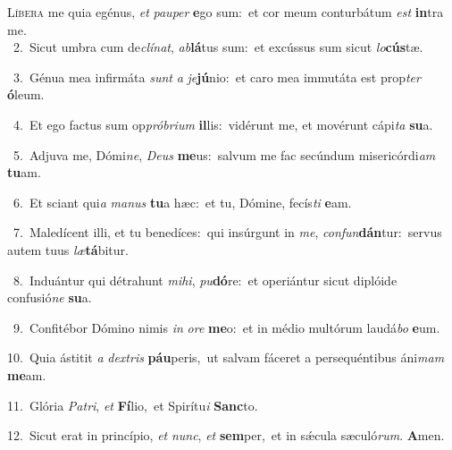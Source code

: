 \lettrine{\initial\textcolor{\initialcolor}{L}}{íbera} me quia egénus, \textit{et} \textit{pau}\-\textit{per} \textbf{e}\-go sum:~\star et cor meum conturbátum \textit{est} \textbf{in}\-tra me.\\
{\numbfont\textcolor{\numbcolor}{~2.}}~Sicut umbra cum de\-\textit{clí}\-\textit{nat}, \textit{ab}\-\textbf{lá}tus sum:~\star et excússus sum sicut \textit{lo}\-\textbf{cús}tæ.\par
{\numbfont\textcolor{\numbcolor}{~3.}}~Génua mea infirmáta \textit{sunt} \textit{a} \textit{je}\-\textbf{jú}nio:~\star et caro mea immutáta est prop\textit{ter} \textbf{ó}\-leum.\par
{\numbfont\textcolor{\numbcolor}{~4.}}~Et ego factus sum op\-\textit{pró}\-\textit{bri}\textit{um} \textbf{il}\-lis:~\star vidérunt me, et movérunt cápi\textit{ta} \textbf{su}\-a.\par
{\numbfont\textcolor{\numbcolor}{~5.}}~Adjuva me, Dómi\-\textit{ne}\-, \textit{De}\-\textit{us} \textbf{me}\-us:~\star salvum me fac secúndum misericórdi\textit{am} \textbf{tu}\-am.\par
{\numbfont\textcolor{\numbcolor}{~6.}}~Et sciant qui\textit{a} \textit{ma}\-\textit{nus} \textbf{tu}\-a hæc:~\star et tu, Dómine, fecís\textit{ti} \textbf{e}\-am.\par
{\numbfont\textcolor{\numbcolor}{~7.}}~Maledícent illi, et tu benedíces:~\dagger qui insúrgunt in \textit{me}\-, \textit{con}\-\textit{fun}\textbf{dán}tur:~\star servus autem tuus \textit{læ}\-\textbf{tá}bitur.\par
{\numbfont\textcolor{\numbcolor}{~8.}}~Induántur qui détrahunt \textit{mi}\-\textit{hi}, \textit{pu}\-\textbf{dó}re:~\star et operiántur sicut diplóide confusió\textit{ne} \textbf{su}\-a.\par
{\numbfont\textcolor{\numbcolor}{~9.}}~Confitébor Dómino nimis \textit{in} \textit{o}\-\textit{re} \textbf{me}\-o:~\star et in médio multórum laudá\textit{bo} \textbf{e}\-um.\par
{\numbfont\textcolor{\numbcolor}{10.}}~Quia ástitit \textit{a} \textit{dex}\-\textit{tris} \textbf{páu}\-peris,~\star ut salvam fáceret a persequéntibus áni\textit{mam} \textbf{me}\-am.\par
{\numbfont\textcolor{\numbcolor}{11.}}~Glória \textit{Pa}\-\textit{tri}, \textit{et} \textbf{Fí}\-lio,~\star et Spirítu\textit{i} \textbf{Sanc}\-to.\par
{\numbfont\textcolor{\numbcolor}{12.}}~Sicut erat in princípio, \textit{et} \textit{nunc}\-, \textit{et} \textbf{sem}\-per,~\star et in sǽcula sæculó\-\textit{rum}\-. \textbf{A}\-men.\par
